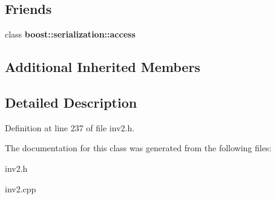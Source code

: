 \subsection*{Friends}
\begin{DoxyCompactItemize}
\item 
\hypertarget{class_ring_ac98d07dd8f7b70e16ccb9a01abf56b9c}{}\label{class_ring_ac98d07dd8f7b70e16ccb9a01abf56b9c} 
class {\bfseries boost\+::serialization\+::access}
\end{DoxyCompactItemize}
\subsection*{Additional Inherited Members}


\subsection{Detailed Description}


Definition at line 237 of file inv2.\+h.



The documentation for this class was generated from the following files\+:\begin{DoxyCompactItemize}
\item 
inv2.\+h\item 
inv2.\+cpp\end{DoxyCompactItemize}
